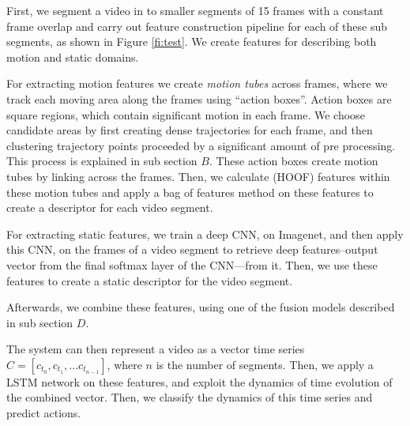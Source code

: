 First, we segment a video in to smaller segments of 15 frames with a constant frame overlap
and carry out feature construction pipeline for each of these sub segments, as shown in Figure \ref{fi:test}.
We create features for describing both motion and static domains.

For extracting motion features we create \textit{motion tubes} across frames, where we track each moving area along the frames using ``action boxes''.
Action boxes are square regions, which contain significant motion in each frame. We choose candidate areas by first creating dense trajectories for each frame,
and then clustering trajectory points proceeded by a significant amount of pre processing. This process is explained in sub section $B$.
These action boxes create motion tubes by linking across the frames. Then, we calculate (HOOF)\cite{chaudhry2009histograms} features within these motion tubes and apply a
bag of features
method on these features to create a descriptor for each video segment.

For extracting static features, we train a deep CNN, on Imagenet, and then apply this CNN,
on the frames of a video segment to retrieve deep features--output vector from the final softmax layer of the CNN---from it. Then, we use these features
to create a static descriptor for the video segment.

Afterwards, we combine these features, using one of the fusion models described in sub section $D$.

The system can then represent a video as a vector time series $C = [c_{t_0}, c_{t_1}, ...c_{t_{n-1}}]$,
where $n$ is the number of segments. Then, we apply a LSTM network on these features, and exploit the dynamics of time evolution of the combined vector.
Then, we classify the dynamics of this time series and predict actions.



